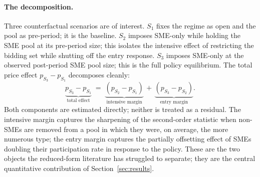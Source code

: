 \paragraph{The decomposition.} Three counterfactual scenarios are of interest. $S_1$ fixes the regime as open and the pool as pre-period; it is the baseline. $S_2$ imposes SME-only while holding the SME pool at its pre-period size; this isolates the intensive effect of restricting the bidding set while shutting off the entry response. $S_3$ imposes SME-only at the observed post-period SME pool size; this is the full policy equilibrium. The total price effect $p_{S_3} - p_{S_1}$ decomposes cleanly:
\begin{equation}
\underbrace{p_{S_3} - p_{S_1}}_{\text{total effect}}
\;=\; \underbrace{(p_{S_2} - p_{S_1})}_{\text{intensive margin}}
   \,+\, \underbrace{(p_{S_3} - p_{S_2})}_{\text{entry margin}}.
\end{equation}
Both components are estimated directly; neither is treated as a residual. The intensive margin captures the sharpening of the second-order statistic when non-SMEs are removed from a pool in which they were, on average, the more numerous type; the entry margin captures the partially offsetting effect of SMEs doubling their participation rate in response to the policy. These are the two objects the reduced-form literature has struggled to separate; they are the central quantitative contribution of Section~\ref{sec:results}.
